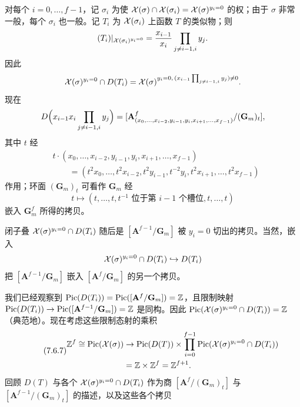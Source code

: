 对每个 $i=0,\dots,f-1$，记 $\sigma_i$ 为使 $\mathcal{X}(\sigma)\cap\mathcal{X}(\sigma_i)=\mathcal{X}(\sigma)^{y_i=0}$ 的权；由于 $\sigma$ 非常一般，每个 $\sigma_i$ 也一般。记 $T_i$ 为 $\mathcal{X}(\sigma_i)$ 上函数 $T$ 的类似物；则
\[
(T_i)|_{\mathcal{X}(\sigma_i)^{y_i=0}}=\frac{x_{i-1}}{x_i}\prod_{j\ne i-1,i}y_j.
\]
因此
\[
\mathcal{X}(\sigma)^{y_i=0}\cap D(T_i)=\mathcal{X}(\sigma)^{y_i=0,\,(x_{i-1}\prod_{j\ne i-1,i}y_j)\ne0}.
\]
现在
\[
D\Bigl(x_{i-1}x_i\prod_{j\ne i-1,i}y_j\Bigr)
=[\mathbf A^{f}_{(x_0,\dots,x_{i-2},y_{i-1},y_i,x_{i+1},\dots,x_{f-1})}/(\mathbf G_m)_t],
\]
其中 $t$ 经
\begin{align*}
&t\cdot(x_0,\dots,x_{i-2},y_{i-1},y_i,x_{i+1},\dots,x_{f-1})\\
&\qquad=(t^2x_0,\dots,t^2x_{i-2},t^2y_{i-1},t^{-2}y_i,t^2x_{i+1},\dots,t^2x_{f-1})
\end{align*}
作用；环面 $(\mathbf G_m)_t$ 可看作 $\mathbf G_m$ 经
\[
t\mapsto(t,\dots,t,t^{-1}\text{ 位于第 }i-1\text{ 个槽位},t,\dots,t)
\]
嵌入 $\mathbf G_m^{f}$ 所得的拷贝。

闭子叠 $\mathcal{X}(\sigma)^{y_i=0}\cap D(T_i)$ 随后是 $[\mathbf A^{f-1}/\mathbf G_m]$ 被 $y_i=0$ 切出的拷贝。当然，嵌入
\[
\mathcal{X}(\sigma)^{y_i=0}\cap D(T_i)\hookrightarrow D(T_i)
\]
把 $[\mathbf A^{f-1}/\mathbf G_m]$ 嵌入 $[\mathbf A^{f}/\mathbf G_m]$ 的另一个拷贝。

我们已经观察到 $\mathrm{Pic}(D(T_i))=\mathrm{Pic}([\mathbf A^{f}/\mathbf G_m])=\mathbb{Z}$，且限制映射 $\mathrm{Pic}(D(T_i))\to\mathrm{Pic}([\mathbf A^{f-1}/\mathbf G_m])=\mathbb{Z}$ 是同构。因此 $\mathrm{Pic}(\mathcal{X}(\sigma)^{y_i=0}\cap D(T_i))=\mathbb{Z}$（典范地）。现在考虑这些限制态射的乘积
\begin{equation}\tag{7.6.7}\label{eq:a4-7-6-7}
\begin{aligned}
\mathbb{Z}^{f}\cong\mathrm{Pic}(\mathcal{X}(\sigma))&\to\mathrm{Pic}(D(T))\times\prod_{i=0}^{f-1}\mathrm{Pic}(\mathcal{X}(\sigma)^{y_i=0}\cap D(T_i))\\
&=\mathbb{Z}\times\mathbb{Z}^{f}=\mathbb{Z}^{f+1}.
\end{aligned}
\end{equation}
回顾 $D(T)$ 与各个 $\mathcal{X}(\sigma)^{y_i=0}\cap D(T_i)$ 作为商 $[\mathbf A^{f}/(\mathbf G_m)_t]$ 与 $[\mathbf A^{f-1}/(\mathbf G_m)_t]$ 的描述，以及这些各个拷贝

